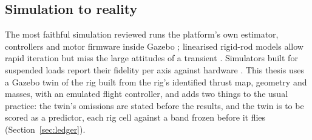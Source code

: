 
\subsection{Simulation to reality}
\label{sec:lit_sim}

The most faithful simulation reviewed runs the platform's own estimator, controllers and motor firmware inside Gazebo
\cite{distributedNMPC, koenig2004gazebo}; linearised rigid-rod models allow rapid iteration but miss the large attitudes
of a transient \cite{DistributedMPC}. Simulators built for suspended loads report their fidelity per axis against
hardware \cite{li2024rotortm, furrer2016rotors, cruz2017cable}. This thesis uses a Gazebo twin of the rig built from the
rig's identified thrust map, geometry and masses, with an emulated flight controller, and adds two things to the usual
practice: the twin's omissions are stated before the results, and the twin is to be scored as a predictor, each rig cell
against a band frozen before it flies (Section~\ref{sec:ledger}).
